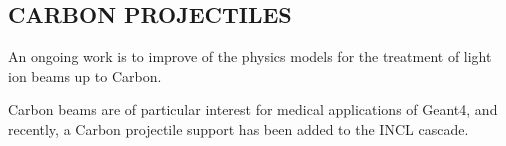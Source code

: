 \documentclass[20pt]{article}
\newenvironment{textbox}
{\begin{lrbox}{\dummybox}\begin{minipage}{0.9\columnwidth}}
{\end{minipage}\end{lrbox}\raisebox{-\depth}{\psshadowbox[framesep=1em,framearc=.1,shadow=true]{\usebox{\dummybox}}}\vspace{0.005\textheight}}
\begin{document}
\begin{center}
\begin{multicols}{3}
\begin{textbox}
\section*{{\Huge {\sf CARBON PROJECTILES}}}
An ongoing work is to improve of the physics models for the treatment of 
light ion beams up to Carbon.

\vspace{1cm}
{\color{udsect}
Carbon beams are of particular interest for medical applications of {\sf
Geant4}, and recently, a Carbon projectile support has been added to the {\sf INCL}
cascade. 

}
\end{textbox}

\end{multicols}
\end{center}
\end{document}

